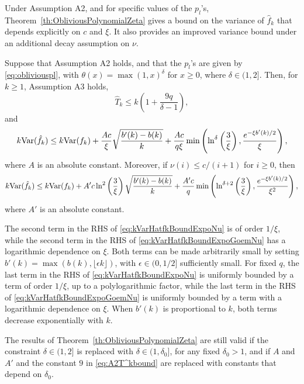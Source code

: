 \documentclass[a4paper,11pt]{article}
\begin{document}
Under Assumption A2, and for specific values of the \(p_{l}\)'s,   Theorem~\ref{th:ObliviousPolynomialZeta} gives a bound on the  variance of \(\hat f_{k}\) that depends explicitly on \(c\) and \(\xi\). It also provides an improved variance bound  under an additional decay  assumption on \(\nu\).         
\begin{theorem}\label{th:ObliviousPolynomialZeta}
Suppose that Assumption A2  holds, and that the \(p_{l}\)'s are given by \eqref{eq:obliviouspl},  with \(\theta(x)=\max(1,x)^{\delta}\) for \(x\geq0\), where \(\delta\in(1,2]\). Then, for \(k\ge1\),   Assumption A3  holds, \begin{equation}\label{eq:A2T^kbound}
\hat T_{k}\le k(1+\frac{9q}{\delta-1}),
\end{equation}  and 
 \begin{equation}\label{eq:kVarHatfkBoundExpoNu}
k{\rm Var}(\hat f_{k})\leq k{\rm Var}(f_{k})+\frac{Ac}{\xi}\sqrt{\frac{b'(k)-b(k)}{k}}+\frac{Ac}{q\xi}\min\left(\ln^{\delta}\left(\frac{3}{\xi}\right),\frac{e^{-\xi b'(k)/2}}{\xi}\right),
\end{equation} where \(A\) is an absolute constant. Moreover, if \(\nu(i)\le c/(i+1)\) for \(i\geq0\), then\begin{equation}\label{eq:kVarHatfkBoundExpoGoemNu}
k{\rm Var}(\hat f_{k})\leq k{\rm Var}(f_{k})+A'c\ln^{2}\left(\frac{3}{\xi}\right)\sqrt{\frac{b'(k)-b(k)}{k}}+\frac{A'c}{q}\min\left(\ln^{\delta+2}\left(\frac{3}{\xi}\right),\frac{e^{-\xi b'(k)/2}}{\xi^{2}}\right),
\end{equation}where \(A'\) is an absolute constant.\end{theorem}
The second term in the RHS of \eqref{eq:kVarHatfkBoundExpoNu} is of order \(1/\xi\), while the second term in the RHS of \eqref{eq:kVarHatfkBoundExpoGoemNu} has a logarithmic dependence on \(\xi\). Both terms can be made arbitrarily small by setting
\(b'(k)=\max(b(k),\lfloor \epsilon k\rfloor)\), with  \(\epsilon\in(0,1/2]\) sufficiently small.  For fixed \(q\), the last term in the RHS of \eqref{eq:kVarHatfkBoundExpoNu}  is  uniformly bounded by a term of order  \(1/\xi\), up to a polylogarithmic factor, while  the last term in the RHS of \eqref{eq:kVarHatfkBoundExpoGoemNu} is  uniformly bounded by a term with a logarithmic  dependence on \(\xi\).
When \(b'(k)\) is proportional to \(k\), both terms decrease exponentially with \(k\). 
\begin{remark} The results of Theorem~\ref{th:ObliviousPolynomialZeta} are still valid if the constraint  \(\delta\in(1,2]\) is replaced with  \(\delta\in(1,\delta_{0}]\), for any fixed \(\delta_{0}>1\), and  if \(A\) and \(A'\)  and the constant \(9\) in  \eqref{eq:A2T^kbound} are replaced with constants that depend on \(\delta_{0}\). 
\end{remark}
\end{document}
